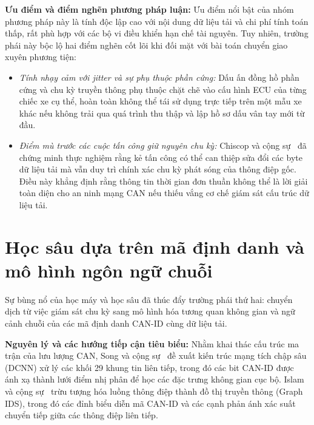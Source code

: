 \documentclass[12pt, a4paper, reqno, oneside]{book}
\begin{document}
\textbf{Ưu điểm và điểm nghẽn phương pháp luận:}
Ưu điểm nổi bật của nhóm phương pháp này là tính độc lập cao với nội dung dữ liệu tải và chi phí tính toán thấp, rất phù hợp với các bộ vi điều khiển hạn chế tài nguyên. Tuy nhiên, trường phái này bộc lộ hai điểm nghẽn cốt lõi khi đối mặt với bài toán chuyển giao xuyên phương tiện:
\begin{itemize}
    \item \textit{Tính nhạy cảm với jitter và sự phụ thuộc phần cứng:} Dấu ấn đồng hồ phần cứng và chu kỳ truyền thông phụ thuộc chặt chẽ vào cấu hình ECU của từng chiếc xe cụ thể, hoàn toàn không thể tái sử dụng trực tiếp trên một mẫu xe khác nếu không trải qua quá trình thu thập và lập hồ sơ dấu vân tay mới từ đầu.
    \item \textit{Điểm mù trước các cuộc tấn công giữ nguyên chu kỳ:} Chiscop và cộng sự~\cite{chiscop2021modification} đã chứng minh thực nghiệm rằng kẻ tấn công có thể can thiệp sửa đổi các byte dữ liệu tải mà vẫn duy trì chính xác chu kỳ phát sóng của thông điệp gốc. Điều này khẳng định rằng thông tin thời gian đơn thuần không thể là lời giải toàn diện cho an ninh mạng CAN nếu thiếu vắng cơ chế giám sát cấu trúc dữ liệu tải.
\end{itemize}

\section{Học sâu dựa trên mã định danh và mô hình ngôn ngữ chuỗi}
Sự bùng nổ của học máy và học sâu đã thúc đẩy trường phái thứ hai: chuyển dịch từ việc giám sát chu kỳ sang mô hình hóa tương quan không gian và ngữ cảnh chuỗi của các mã định danh CAN-ID cùng dữ liệu tải.

\textbf{Nguyên lý và các hướng tiếp cận tiêu biểu:}
Nhằm khai thác cấu trúc ma trận của lưu lượng CAN, Song và cộng sự~\cite{song2020dcnn} đề xuất kiến trúc mạng tích chập sâu (DCNN) xử lý các khối 29 khung tin liên tiếp, trong đó các bit CAN-ID được ánh xạ thành lưới điểm nhị phân để học các đặc trưng không gian cục bộ. Islam và cộng sự~\cite{islam2020graph} trừu tượng hóa luồng thông điệp thành đồ thị truyền thông (Graph IDS), trong đó các đỉnh biểu diễn mã CAN-ID và các cạnh phản ánh xác suất chuyển tiếp giữa các thông điệp liên tiếp.
\end{document}
